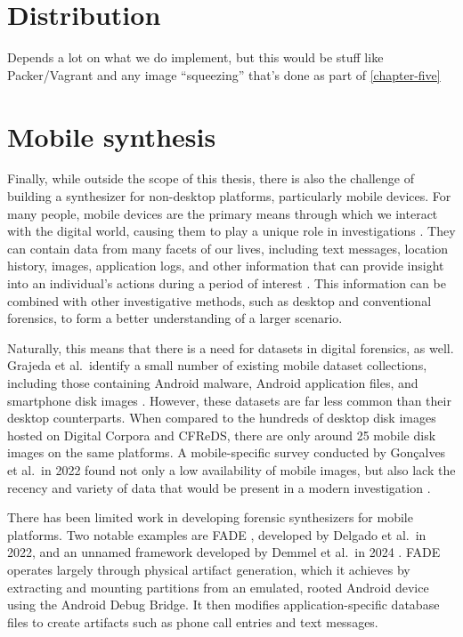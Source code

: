 \section{Distribution}\label{distribution}

Depends a lot on what we do implement, but this would be stuff like
Packer/Vagrant and any image ``squeezing'' that's done as part of
\autoref{chapter-five}

\section{Mobile synthesis}\label{mobile-synthesis}

Finally, while outside the scope of this thesis, there is also the
challenge of building a synthesizer for non-desktop platforms,
particularly mobile devices. For many people, mobile devices are the
primary means through which we interact with the digital world, causing
them to play a unique role in investigations
\cite{chernyshevMobileForensicsAdvances2017}. They can contain data
from many facets of our lives, including text messages, location
history, images, application logs, and other information that can
provide insight into an individual's actions during a period of interest
\cite{sutiknoCapabilitiesCellebriteUniversal2024}. This information
can be combined with other investigative methods, such as desktop and
conventional forensics, to form a better understanding of a larger
scenario.

Naturally, this means that there is a need for datasets in digital
forensics, as well. Grajeda et al.~identify a small number of existing
mobile dataset collections, including those containing Android malware,
Android application files, and smartphone disk images
\cite{grajedaAvailabilityDatasetsDigital2017}. However, these
datasets are far less common than their desktop counterparts. When
compared to the hundreds of desktop disk images hosted on Digital
Corpora and CFReDS, there are only around 25 mobile disk images on the
same platforms. A mobile-specific survey conducted by Gonçalves et
al.~in 2022 found not only a low availability of mobile images, but also
lack the recency and variety of data that would be present in a modern
investigation \cite{goncalvesRevisitingDatasetGap2022}.

There has been limited work in developing forensic synthesizers for
mobile platforms. Two notable examples are FADE
\cite{ceballosdelgadoFADEForensicImage2022}, developed by Delgado et
al.~in 2022, and an unnamed framework developed by Demmel et al.~in 2024
\cite{demmelDataSynthesisGoing2024}. FADE operates largely through
physical artifact generation, which it achieves by extracting and
mounting partitions from an emulated, rooted Android device using the
Android Debug Bridge. It then modifies application-specific database
files to create artifacts such as phone call entries and text messages.

